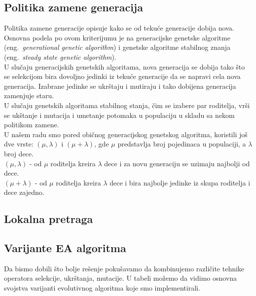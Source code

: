 \documentclass{article}
\begin{document}
\subsection{Politika zamene generacija}
 \label{sec:ea_zamena}
 Politika zamene generacije \cite{vi_Janicic} opisuje kako se od tekuće generacije dobija nova. Osnovna podela po ovom kriterijumu je na generacijske genetske algoritme (eng.~{\em generational genetic algorithm}) i genetske algoritme stabilnog znanja (eng.~{\em steady state genetic algorithm}). \\
 
 U slučaju generacijskih genetskih algoritama, nova generacija se dobija tako što se selekcijom bira dovoljno jedinki iz tekuće generacije da se napravi cela nova generacija. Izabrane jedinke se ukrštaju i mutiraju i tako dobijena generacija zamenjuje staru. \\
 
 U slučaju genetskih algoritama stabilnog stanja, čim se izabere par roditelja, vrši se ukštanje i mutacija i umetanje potomaka u populaciju u skladu sa nekom politikom zamene. \\
 
 U našem radu smo pored običnog generacijskog genetskog algoritma, koristili još dve vrste: $(\mu, \lambda) $ i $(\mu + \lambda)$, gde $\mu$ predstavlja broj pojedinaca u populaciji, a $\lambda$ broj dece. \\
 
 $(\mu, \lambda)$ - od $\mu$ roditelja kreira $\lambda$ dece i za novu generaciju se uzimaju  najbolji od dece.\\
 
$(\mu + \lambda)$ - od $\mu$ roditelja kreira $\lambda$ dece i bira najbolje jedinke iz skupa roditelja i dece zajedno.

\subsection{Lokalna pretraga}
 \label{sec:ea_lokalna_pretraga}

\subsection{Varijante EA algoritma}
\label{sec:ea_varijante}

Da bismo dobili što bolje rešenje pokušavamo da kombinujemo različite tehnike operatora selekcije, ukrštanja, mutacije. U tabeli možemo da vidimo osnovna svojstva varijanti evolutivnog algoritma koje smo implementirali.
 
\end{document}
